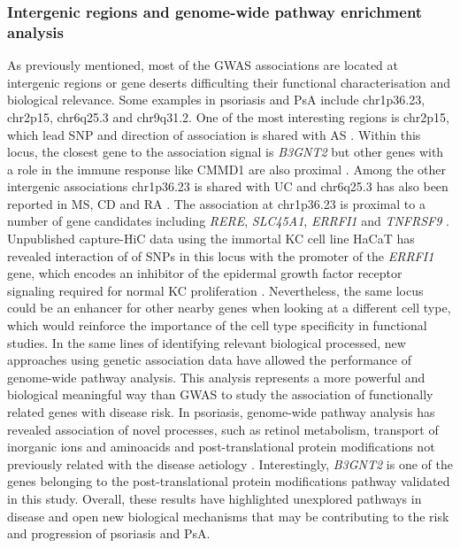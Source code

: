 \subsubsection{Intergenic regions and genome-wide pathway enrichment analysis}
As previously mentioned, most of the GWAS associations are located at intergenic regions or gene deserts difficulting their functional characterisation and biological relevance. Some examples in psoriasis and PsA include chr1p36.23, chr2p15, chr6q25.3 and chr9q31.2. One of the most interesting regions is chr2p15, which lead SNP and direction of association is shared with AS \parencite{Immunobase}. Within this locus, the closest gene to the association signal is \textit{B3GNT2} but other genes with a role in the immune response like CMMD1 are also proximal \parencite{Maine2007}. Among the other intergenic associations chr1p36.23 is shared with UC and chr6q25.3 has also been reported in MS, CD and RA \parencite{Immunobase}. The association at chr1p36.23 is proximal to a number of gene candidates including \textit{RERE}, \textit{SLC45A1}, \textit{ERRFI1} and \textit{TNFRSF9} \parencite{Tsoi2012}. Unpublished capture-HiC data using the immortal KC cell line  HaCaT has revealed interaction of of SNPs in this locus with the promoter of the \textit{ERRFI1} gene, which encodes an inhibitor of the epidermal growth factor receptor signaling required for normal KC proliferation \parencite{Ray-Jones2017}. Nevertheless, the same locus could be an enhancer for other nearby genes when looking at a different cell type, which would reinforce the importance of the cell type specificity in functional studies. 
In the same lines of identifying relevant biological processed, new approaches using genetic association data have allowed the performance of genome-wide pathway analysis. This analysis represents a more powerful and biological meaningful way than GWAS to study the association of functionally related genes with disease risk. In psoriasis, genome-wide pathway analysis has revealed association of novel processes, such as retinol metabolism, transport of inorganic ions and aminoacids and post-translational protein modifications not previously related with the disease aetiology \parencite{Aterido2015}. Interestingly, \textit{B3GNT2} is one of the genes belonging to the post-translational protein modifications pathway validated in this study. Overall, these results have highlighted unexplored pathways in disease and open new biological mechanisms that may be contributing to the risk and progression of psoriasis and PsA. 
  
